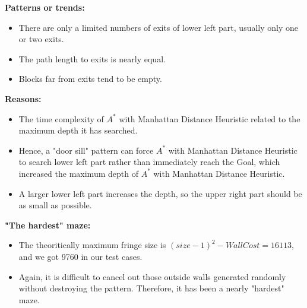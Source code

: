 \documentclass[letter]{article}
\begin{document}
\begin{enumerate}[resume]
\begin{enumerate}
\begin{enumerate}
				\textbf{Patterns or trends:} 
				\begin{itemize}
					\item {There are only a limited numbers of exits of lower left part, usually only one or two exits.}
					\item {The path length to exits is nearly equal.}
					\item {Blocks far from exits tend to be empty.}
				\end{itemize}
				
				\textbf{Reasons:} 
				\begin{itemize}
					\item {The time complexity of $ A^* $ with Manhattan Distance Heuristic related to the maximum depth it has searched.}
					\item {Hence, a "door sill" pattern can force $ A^* $ with Manhattan Distance Heuristic to search lower left part rather than immediately reach the Goal, which increased the maximum depth of $ A^* $ with Manhattan Distance Heuristic.}
					\item {A larger lower left part increases the depth, so the upper right part should be as small as possible.}
				\end{itemize}
				
				\textbf{"The hardest" maze:} 
				\begin{itemize}
					\item {The theoritically maximum fringe size is $(size - 1)^2 - WallCost = 16113$, and we got 9760 in our test cases.}
					\item {Again, it is difficult to cancel out those outside walls generated randomly without destroying the pattern. Therefore, it has been a nearly "hardest" maze.}
				\end{itemize}
			\end{enumerate}
		\end{enumerate}
	\end{enumerate}
\end{document}
